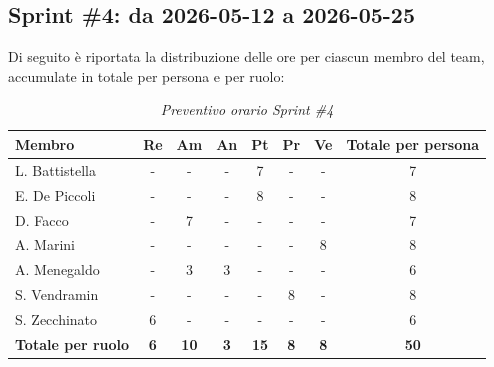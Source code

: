 ﻿\documentclass[a4paper, 10pt, colorlinks=true, linkcolor=black, urlcolor=blue, citecolor=blue, hidelinks]{article}
\renewcommand{\arraystretch}{1.2}
\begin{document}
\subsection{Sprint \#4: da 2026-05-12 a 2026-05-25}
Di seguito è riportata la distribuzione delle ore per ciascun membro del team,
accumulate in totale per persona e per ruolo:
\begin{table}[H]
    \centering
    \renewcommand{\arraystretch}{1.4}
    \begin{tabular}{|l|c|c|c|c|c|c|c|}
        \hline
        \rowcolor{bluBitless!15}
        \textbf{Membro} & \textbf{Re} & \textbf{Am} & \textbf{An} & \textbf{Pt} & \textbf{Pr} & \textbf{Ve} & \textbf{Totale per persona} \\
        \hline
        L. Battistella & - & - & - & 7 & - & - & 7 \\ \hline
        E. De Piccoli & - & - & - & 8 & - & - & 8 \\ \hline
        D. Facco & - & 7 & - & - & - & - & 7 \\ \hline
        A. Marini & - & - & - & - & - & 8 & 8 \\ \hline
        A. Menegaldo & - & 3 & 3 & - & - & - & 6 \\ \hline
        S. Vendramin & - & - & - & - & 8 & - & 8 \\ \hline
        S. Zecchinato & 6 & - & - & - & - & - & 6 \\ \hline
        \rowcolor{bluBitless!8}
        \textbf{Totale per ruolo} & \textbf{6} & \textbf{10} & \textbf{3} & \textbf{15} & \textbf{8} & \textbf{8} & \textbf{50} \\
        \hline
    \end{tabular}
    \caption{\textit{Preventivo orario Sprint \#4}}
\end{table}
\end{document}
